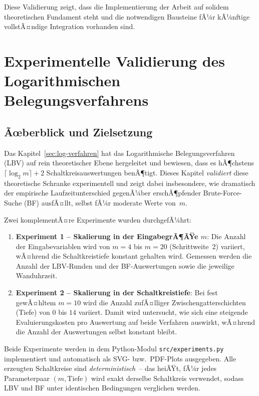 ﻿\documentclass[a4paper,12pt]{article}
\theoremstyle{definition}
\begin{document}
Diese Validierung zeigt, dass die Implementierung der Arbeit auf solidem theoretischen Fundament steht und die notwendigen Bausteine fÃ¼r kÃ¼nftige vollstÃ¤ndige Integration vorhanden sind.

\section{Experimentelle Validierung des Logarithmischen Belegungsverfahrens}
\label{sec:experimente}

\subsection{Ãœberblick und Zielsetzung}

Das Kapitel~\ref{sec:log-verfahren} hat das Logarithmische Belegungsverfahren (LBV) auf
rein theoretischer Ebene hergeleitet und bewiesen, dass es hÃ¶chstens
$\lceil \log_2 m \rceil + 2$ Schaltkreisauswertungen benÃ¶tigt.  Dieses Kapitel
\emph{validiert} diese theoretische Schranke experimentell und zeigt dabei
insbesondere, wie dramatisch der empirische Laufzeitunterschied gegenÃ¼ber
erschÃ¶pfender Brute-Force-Suche (BF) ausfÃ¤llt, selbst fÃ¼r moderate Werte von~$m$.

Zwei komplementÃ¤re Experimente wurden durchgefÃ¼hrt:

\begin{enumerate}
  \item \textbf{Experiment 1 -- Skalierung in der EingabegrÃ¶ÃŸe $m$}:  Die Anzahl der
    Eingabevariablen wird von $m = 4$ bis $m = 20$ (Schrittweite~2) variiert, wÃ¤hrend
    die Schaltkreistiefe konstant gehalten wird.  Gemessen werden die Anzahl der LBV-Runden
    und der BF-Auswertungen sowie die jeweilige Wanduhrzeit.

  \item \textbf{Experiment 2 -- Skalierung in der Schaltkreistiefe}:  Bei fest gewÃ¤hltem
    $m = 10$ wird die Anzahl zufÃ¤lliger Zwischengatterschichten (Tiefe) von $0$ bis $14$
    variiert.  Damit wird untersucht, wie sich eine steigende Evaluierungskosten pro
    Auswertung auf beide Verfahren auswirkt, wÃ¤hrend die Anzahl der Auswertungen selbst
    konstant bleibt.
\end{enumerate}

Beide Experimente werden in dem Python-Modul \texttt{src/experiments.py} implementiert
und automatisch als SVG- bzw.\ PDF-Plots ausgegeben.  Alle erzeugten Schaltkreise
sind \emph{deterministisch}~-- das heiÃŸt, fÃ¼r jedes Parameterpaar $(m, \mathrm{Tiefe})$
wird exakt derselbe Schaltkreis verwendet, sodass LBV und BF unter identischen
Bedingungen verglichen werden.
\end{document}
